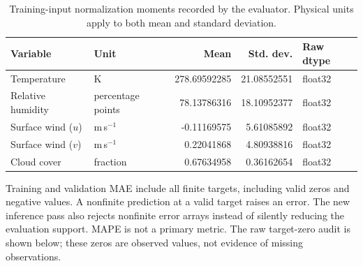 \documentclass[10pt,a4paper]{article}
\begin{document}
\begin{table}[H]\centering\small\setlength{\tabcolsep}{5pt}\setlength{\parskip}{0pt}

\caption{Training-input normalization moments recorded by the evaluator. Physical units apply to both mean and standard deviation.}\label{tab:scalers}

\begin{tabular}{llrrl}

\toprule
Variable & Unit & Mean & Std. dev. & Raw dtype \\
\midrule

Temperature & K & 278.69592285 & 21.08552551 & float32 \\

Relative humidity & percentage points & 78.13786316 & 18.10952377 & float32 \\

Surface wind ($u$) & m\,s$^{-1}$ & -0.11169575 & 5.61085892 & float32 \\

Surface wind ($v$) & m\,s$^{-1}$ & 0.22041868 & 4.80938816 & float32 \\

Cloud cover & fraction & 0.67634958 & 0.36162654 & float32 \\

\bottomrule\end{tabular}\end{table}

Training and validation MAE include all finite targets, including valid zeros and negative values. A nonfinite prediction at a valid target raises an error. The new inference pass also rejects nonfinite error arrays instead of silently reducing the evaluation support. MAPE is not a primary metric. The raw target-zero audit is shown below; these zeros are observed values, not evidence of missing observations.
\end{document}
